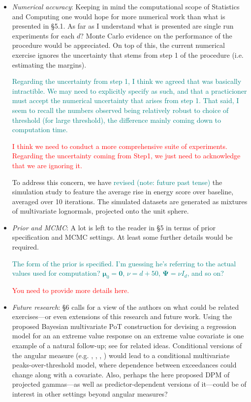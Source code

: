 \documentclass[10pt]{article}
\newcommand{\comment}[1]{\textcolor{teal}{#1}}
\newcommand{\bruno}[1]{\textcolor{red}{#1}}
\begin{document}
\begin{itemize}
    \item \emph{Numerical accuracy}:  Keeping in mind the computational scope of Statistics and 
    Computing one would hope for more numerical work than what is presented in §5.1. As far as I
    understand what is presented are single run experiments for each $d$? Monte Carlo evidence on the
    performance of the procedure would be appreciated. On top of this, the current numerical exercise
    ignores the uncertainty that stems from step 1 of the procedure (i.e. estimating the margins).

    \comment{Regarding the uncertainty from step 1, I think we agreed that was basically intractible.
    We may need to explicitly specify as such, and that a practicioner must accept the numerical 
    uncertainty that arises from step 1.  That said, I seem to recall the numbers observed being 
    relatively robust to choice of threshold (for large threshold), the difference mainly coming 
    down to computation time.}
    
    \bruno{I think we need to conduct a more comprehensive suite of experiments. Regarding the uncertainty 
    coming from Step1, we just need to acknowledge that we are ignoring it.}

    To address this concern, we have \comment{revised (note: future past tense)} the simulation study 
    to feature the average rise in energy score over baseline, averaged over 10 iterations.  The simulated
    datasets are generated as mixtures of multivariate lognormals, projected onto the unit sphere.
    
    \item \emph{Prior and MCMC}: A lot is left to the reader in §5 in terms of prior specification
    and MCMC settings.  At least some further details would be required.

    \comment{The form of the prior is specified.  I'm guessing he's referring to the actual values
    used for computation?  $\bm{\mu}_0 = \bm{0}$, $\nu = d + 50$, $\bm{\Psi} = \nu I_d$, and so on?}
    
    \bruno{You need to provide more details here.}

    \item \emph{Future research}: §6 calls for a view of the authors on what could be related 
    exercises—or even extensions of this research and future work. Using the proposed Bayesian 
    multivariate PoT construction for devising a regression model for an an extreme value response 
    on an extreme value covariate is one example of a natural follow-up; see \cite{carvalho2022}
    for related ideas. Conditional versions of the angular measure (e.g. \cite{carvalho2016},
    \cite{castro2018}, \cite{escobar2018}, \cite{mhalla2019}) would lead to a conditional 
    multivariate peaks-over-threshold model, where dependence between exceedances could change 
    along with a covariate. Also, perhaps the here proposed DPM of projected gammas—as well as 
    predictor-dependent versions of it—could be of interest in other settings beyond angular 
    measures?


\end{itemize}
\end{document}
